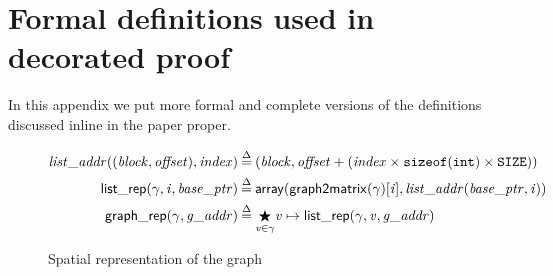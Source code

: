 \section{Formal definitions used in decorated proof}

In this appendix we put more formal and complete versions 
of the definitions discussed inline in the paper proper.

\begin{figure}
\begin{equation*}
\begin{split}
\m{list\_addr} ((\m{block}, \m{offset}), \m{index}) &\defeq
  (\m{block}, \m{offset} + (\m{index} \times \texttt{sizeof}(\texttt{int}) \times \texttt{SIZE})) \\
\p{list\_rep}(\gamma, \m{i}, \m{base\_ptr}) &\defeq \mathsf{array}(\mathsf{graph2matrix}(\gamma)[\m{i}], \m{list\_addr}(\m{base\_ptr}, \m{i})) \\
\vspace{1em}
\p{graph\_rep}(\gamma, \m{g\_addr}) &\defeq \underset{\m{v} \in \gamma}{\bigstar} \m{v}  \mapsto\p{list\_rep}(\gamma, \m{v}, \m{g\_addr})
\end{split}
\end{equation*}
\caption{Spatial representation of the graph}
\end{figure}

